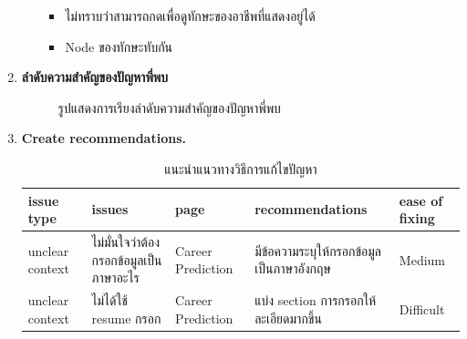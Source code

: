 \begin{enumerate}
\begin{enumerate}
              \begin{itemize}
                \item ไม่ทราบว่าสามารถกดเพื่อดูทักษะของอาชีพที่แสดงอยู่ได้
                \item Node ของทักษะทับกัน
              \end{itemize}
    \end{enumerate}
    \item \textbf{ลำดับความสำคัญของปัญหาพี่พบ}
    \begin{figure}[H]\centering
        \caption{รูปแสดงการเรียงลำดับความสำคัญของปัญหาพี่พบ}\label{fig:PrioritizeUT}
    \end{figure}
    \item \textbf{Create recommendations.}
    \begin{table}[H]
        \caption{แนะนำแนวทางวิธีการแก้ไขปัญหา}
        \label{tab:recommendationsUT}
        \begin{tabularx}{\textwidth}{|l|X|l|X|l|}
        \hline
        \textbf{issue type} & \textbf{issues}                                        & \textbf{page}      & \textbf{recommendations}                                      & \textbf{ease of fixing} \\ \hline
        unclear context     & ไม่มั่นใจว่าต้องกรอกข้อมูลเป็นภาษาอะไร         & Career Prediction  & มีข้อความระบุให้กรอกข้อมูลเป็นภาษาอังกฤษ                      & Medium                  \\ \hline
        unclear context     & ไม่ได้ใช้ resume กรอก                           & Career Prediction  & แบ่ง section การกรอกให้ละเอียดมากขึ้น                         & Difficult               \\ \hline

\end{tabularx}
\end{table}
\end{enumerate}
